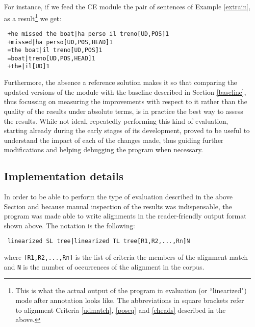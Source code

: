 For instance, if we feed the CE module the pair of sentences of Example \ref{extrain}, as a result\footnote{This is what the actual output of the program in evaluation (or ``linearized") mode after annotation looks like. The abbreviations in square brackets refer to alignment Criteria \ref*{udmatch}, \ref{poseq} and \ref{cheads} described in the above.} we get: \smallskip \label{cann}
\begin{verbatim} 
 +he missed the boat|ha perso il treno[UD,POS]1
 +missed|ha perso[UD,POS,HEAD]1
 =the boat|il treno[UD,POS]1
 =boat|treno[UD,POS,HEAD]1
 +the|il[UD]1
\end{verbatim} 
\smallskip

Furthermore, the absence a reference solution makes it so that comparing the updated versions of the module with the baseline described in Section \ref{baseline}, thus focussing on measuring the improvements with respect to it rather than the quality of the results under absolute terms, is in practice the best way to assess the results.
While not ideal, repeatedly performing this kind of evaluation, starting already during the early stages of its development, proved to be useful to understand the impact of each of the changes made, thus guiding further modifications and helping debugging the program when necessary. \smallskip

\subsection{Implementation details} \label{evalign}
In order to be able to perform the type of evaluation described in the above Section and because manual inspection of the results was indispensable, the program was made able to write alignments in the reader-friendly output format shown above. The notation is the following: \smallskip

\begin{verbatim}
 linearized SL tree|linearized TL tree[R1,R2,...,Rn]N
\end{verbatim} \smallskip

where \texttt{[R1,R2,...,Rn]} is the list of criteria the members of the alignment match and \texttt{N} is the number of occurrences of the alignment in the corpus. \smallskip

